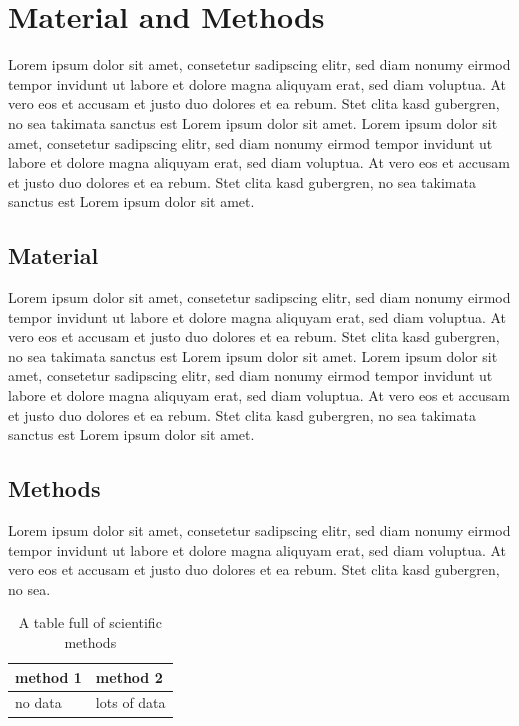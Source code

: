 \documentclass[egregdoesnotlikesansseriftitles, 12pt]{scrartcl}
\begin{document}
\newpage

\section{Material and Methods}
Lorem ipsum dolor sit amet, consetetur sadipscing elitr, sed diam nonumy eirmod tempor invidunt ut labore et dolore magna aliquyam erat, sed diam voluptua. At vero eos et accusam et justo duo dolores et ea rebum. Stet clita kasd gubergren, no sea takimata sanctus est Lorem ipsum dolor sit amet. Lorem ipsum dolor sit amet, consetetur sadipscing elitr, sed diam nonumy eirmod tempor invidunt ut labore et dolore magna aliquyam erat, sed diam voluptua. At vero eos et accusam et justo duo dolores et ea rebum. Stet clita kasd gubergren, no sea takimata sanctus est Lorem ipsum dolor sit amet.
\subsection{Material}
Lorem ipsum dolor sit amet, consetetur sadipscing elitr, sed diam nonumy eirmod tempor invidunt ut labore et dolore magna aliquyam erat, sed diam voluptua. At vero eos et accusam et justo duo dolores et ea rebum. Stet clita kasd gubergren, no sea takimata sanctus est Lorem ipsum dolor sit amet. Lorem ipsum dolor sit amet, consetetur sadipscing elitr, sed diam nonumy eirmod tempor invidunt ut labore et dolore magna aliquyam erat, sed diam voluptua. At vero eos et accusam et justo duo dolores et ea rebum. Stet clita kasd gubergren, no sea takimata sanctus est Lorem ipsum dolor sit amet.
\subsection{Methods}
Lorem ipsum dolor sit amet, consetetur sadipscing elitr, sed diam nonumy eirmod tempor invidunt ut labore et dolore magna aliquyam erat, sed diam voluptua. At vero eos et accusam et justo duo dolores et ea rebum. Stet clita kasd gubergren, no sea.
\begin{table}[h]
    \centering
    \begin{tabular}{|l|l|}
        \hline
        method 1 & method 2 \\ \hline
        no data & lots of data \\ \hline
    \end{tabular}
    \caption{A table full of scientific methods}
    \label{tab:my_label}
\end{table}
\newpage
\end{document}
